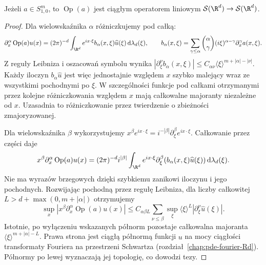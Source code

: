 \begin{lemat}
\label{lem:pde31-schwartz-op}
Jeżeli $a\in S^m_{1,0}$, to $\operatorname{Op}(a)$
jest ciągłym operatorem liniowym
$\mathcal S(\R^d)\to\mathcal S(\R^d)$.
\end{lemat}
\begin{proof}
Dla wielowskaźnika $\alpha$ różniczkujemy pod całką:
\[
 \partial_x^\alpha\operatorname{Op}(a)u(x)
 =(2\pi)^{-d}\int_{\R^d}e^{ix\cdot\xi}
 b_\alpha(x,\xi)\widehat u(\xi)\,\mathrm d\lambda_d(\xi),
 \qquad
 b_\alpha(x,\xi)=
 \sum_{\gamma\le\alpha}\binom{\alpha}{\gamma}
 (i\xi)^{\alpha-\gamma}\partial_x^\gamma a(x,\xi).
\]
Z reguły Leibniza i oszacowań symbolu wynika
$|\partial_\xi^\nu b_\alpha(x,\xi)|
\le C_{\alpha\nu}\langle\xi\rangle^{m+|\alpha|-|\nu|}$.
Każdy iloczyn $b_\alpha\widehat u$ jest więc
jednostajnie względem $x$ szybko malejący wraz
ze wszystkimi pochodnymi po $\xi$.
W szczególności funkcje pod całkami otrzymanymi
przez kolejne różniczkowania względem $x$
mają całkowalne majoranty niezależne od $x$.
Uzasadnia to różniczkowanie przez twierdzenie
o zbieżności zmajoryzowanej.

Dla wielowskaźnika $\beta$ wykorzystujemy
$x^\beta e^{ix\cdot\xi}=i^{-|\beta|}
\partial_\xi^\beta e^{ix\cdot\xi}$.
Całkowanie przez części daje
\[
 x^\beta\partial_x^\alpha\operatorname{Op}(a)u(x)
 =(2\pi)^{-d}i^{|\beta|}
 \int_{\R^d}e^{ix\cdot\xi}
 \partial_\xi^\beta(b_\alpha(x,\xi)\widehat u(\xi))
 \,\mathrm d\lambda_d(\xi).
\]
Nie ma wyrazów brzegowych dzięki szybkiemu
zanikowi iloczynu i jego pochodnych.
Rozwijając pochodną przez regułę Leibniza,
dla liczby całkowitej $L> d+\max(0,m+|\alpha|)$
otrzymujemy
\[
 \sup_x|x^\beta\partial_x^\alpha\operatorname{Op}(a)u(x)|
 \le C_{\alpha\beta L}
 \sum_{\nu\le\beta}\sup_\xi
 \langle\xi\rangle^L|\partial_\xi^\nu\widehat u(\xi)|.
\]
Istotnie, po wyłączeniu wskazanych półnorm
pozostaje całkowalna majoranta
$\langle\xi\rangle^{m+|\alpha|-L}$.
Prawa strona jest ciągłą półnormą funkcji $u$
na mocy ciągłości transformaty Fouriera na przestrzeni
Schwartza (rozdział~\ref{chap:pde-fourier-Rd}).
Półnormy po lewej wyznaczają jej topologię,
co dowodzi tezy.
\end{proof}


